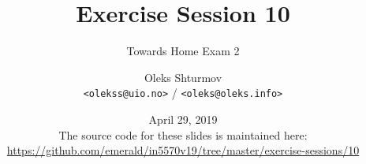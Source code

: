 \documentclass[xcolor=table]{beamer}
\title{{\Large Exercise Session 10}}
\subtitle{Towards Home Exam 2}
\institute{{\large University of Oslo}\\[0.2em] IN[59]570: Distributed Objects}
\author{Oleks Shturmov\\[-0.2em]%
  {\tiny \texttt{<olekss@uio.no>} / \texttt{<oleks@oleks.info>}}
}
\date{April 29, 2019\\[2em]
{\scriptsize The source code for these slides is maintained here: \\[-0.5em] {\tiny%
\url{https://github.com/emerald/in5570v19/tree/master/exercise-sessions/10}}%
}}
\begin{document}
\begin{frame} \titlepage \end{frame}










\end{document}
